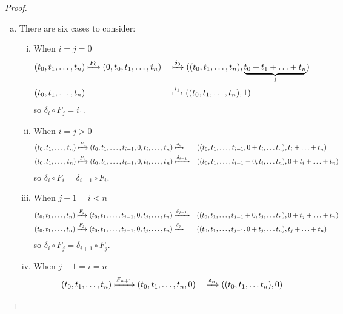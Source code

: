 \documentclass{article}
\begin{document}
\begin{proof} \text{} \\
  \begin{enumerate}[a.]
    \item There are six cases to consider:
    \begin{enumerate}[(i)]
      \item
      When $i = j = 0$ \begin{alignat*}{2}
        (t_0, t_1, \hdots, t_n)
        &\xmapsto{F_0} (0, t_0, t_1, \hdots, t_n)
        &&\xmapsto{\delta_0} ((t_0, t_1, \hdots, t_n), \underbrace{t_0 + t_1 + \hdots + t_n}_1) \\
        (t_0, t_1, \hdots, t_n) & &&\xmapsto{i_1} ((t_0, t_1, \hdots, t_n), 1)
      \end{alignat*}
      so $\delta_i \circ F_j = i_1$.
      \item
      When $i = j > 0$ \begin{alignat*}{2}
        (t_0, t_1, \hdots, t_n)
        &\xmapsto{F_i} (t_0, t_1, \hdots, t_{i-1}, 0, t_i, \hdots, t_n)
        \xmapsto{\delta_i} &&((t_0, t_1, \hdots, t_{i-1}, 0 + t_i, \hdots t_n), t_i + \hdots + t_n) \\
        (t_0, t_1, \hdots, t_n)
        &\xmapsto{F_i} (t_0, t_1, \hdots, t_{i-1}, 0, t_i, \hdots, t_n)
        \xmapsto{\delta_{i-1}} &&((t_0, t_1, \hdots, t_{i-1} + 0, t_i, \hdots t_n), 0 + t_i + \hdots + t_n)
      \end{alignat*}
      so $\delta_i \circ F_i = \delta_{i-1} \circ F_i$.
      \item
      When $j - 1 = i < n$ \begin{alignat*}{2}
        (t_0, t_1, \hdots, t_n)
        &\xmapsto{F_j} (t_0, t_1, \hdots, t_{j-1}, 0, t_j, \hdots, t_n)
        \xmapsto{\delta_{j-1}} &&((t_0, t_1, \hdots, t_{j-1} + 0, t_j, \hdots t_n), 0 + t_j + \hdots + t_n) \\
        (t_0, t_1, \hdots, t_n)
        &\xmapsto{F_j} (t_0, t_1, \hdots, t_{j-1}, 0, t_{j}, \hdots, t_n)
        \xmapsto{\delta_j} &&((t_0, t_1, \hdots, t_{j-1}, 0 + t_j, \hdots t_n), t_j + \hdots + t_n)
      \end{alignat*}
      so $\delta_i \circ F_j = \delta_{i+1} \circ F_j$.
      \item
      When $j - 1 = i = n$ \begin{alignat*}{2}
        (t_0, t_1, \hdots, t_n)
        &\xmapsto{F_{n+1}} (t_0, t_1, \hdots, t_n, 0)
        &&\xmapsto{\delta_n} ((t_0, t_1, \hdots t_n), 0) \\

\end{alignat*}
\end{enumerate}
\end{enumerate}
\end{proof}
\end{document}
